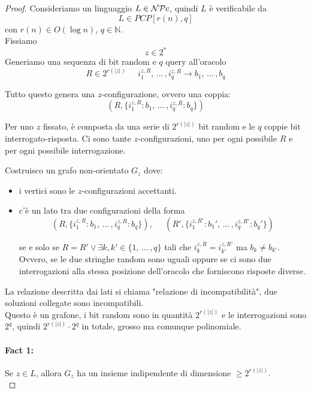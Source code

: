 \begin{proof}
	Consideriamo un linguaggio $L \in \mathcal{NP} c$, quindi $L$ è verificabile da 
	$$ L \in PCP [r(n), q] $$
	con $r(n) \in O(\log n)$, $q \in \mathbb{N}$.\\
	
	Fissiamo 
	$$ z \in 2^\ast $$
	Generiamo una sequenza di bit random e $q$ query all'oracolo
	$$ R \in 2^{r(|z|)} \;\;\;\;\; i_1^{z,R}, \, \dots \, , i_q^{z,R} \rightarrow b_1, \, \dots \, , b_q $$
	
	Tutto questo genera una $z$-configurazione, ovvero una coppia: 
	$$ (R, \{i_1^{z,R}: b_1, \, \dots \, , i_q^{z,R}: b_q\}) 	$$
	
	Per uno $z$ fissato, è composta da una serie di $2^{r(|z|)}$ bit random e le $q$ coppie bit interrogato-risposta. Ci sono tante $z$-configurazioni, uno per ogni possibile $R$ e per ogni possibile interrogazione.\\
	
	\newpage
	
	Costruisco un grafo non-orientato $G_z$ dove: 
	\begin{itemize}
		\item i vertici sono le $z$-configurazioni accettanti.\\
		
		\item c'è un lato tra due configurazioni della forma
		$$ 
		(R, \{i_1^{z,R}: b_1, \, \dots \, , i_q^{z,R}: b_q\}), \;\;\;\;\; (R', \{i_1^{z,R'}: b_1', \, \dots \, , i_q^{z,R'}: b_q'\}) 
		$$
		
		se e solo se $R = R' \vee \exists k, k' \in \{1, \, \dots \, , q\}$ tali che $i_k^{z,R} = i_{k'}^{z,R'}$ ma $b_k \neq b_{k'}$. Ovvero, se le due stringhe random sono uguali oppure se ci sono due interrogazioni alla stessa posizione dell'oracolo che forniscono risposte diverse. \\
	\end{itemize}

	La relazione descritta dai lati si chiama "relazione di incompatibilità", due soluzioni collegate sono incompatibili.\\
	
	Questo è un grafone, i bit random sono in quantità $2^{r(|z|)}$ e le interrogazioni sono $2^q$, quindi $2^{r(|z|)} \cdot 2^q$ in totale, grosso ma comunque polinomiale.\\
	
	\paragraph{Fact 1:} Se $z \in L$, allora $G_z$ ha un insieme indipendente di dimensione $\geq 2^{r(|z|)}$.\\
	

\end{proof}
